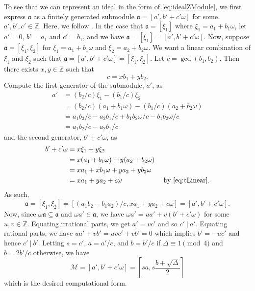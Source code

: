 \documentclass{ucalgthes1}
\theoremstyle{plain}
\theoremstyle{definition}
\newcommand{\MM}{\mathcal{M}}
\newcommand{\ZZ}{\mathbb{Z}}
\begin{document}
To see that we can represent an ideal in the form of \eqref{eq:idealZModule}, we first express $\mathfrak a$ as a finitely generated submodule $\mathfrak a=[a',b'+c'\omega]$ for some $a',b',c' \in \ZZ$.  Here, we follow \cite[pp~85-86]{Jac09}.  In the case that $\mathfrak a = [\xi_1]$ where $\xi_1 = a_1+b_1\omega$, let $a'=0$, $b' = a_1$ and $c'=b_1$, and we have $\mathfrak a = [\xi_1] = [a', b'+c'\omega]$.  Now, suppose $\mathfrak a = [\xi_1, \xi_2]$ for $\xi_1 = a_1 + b_1\omega$ and $\xi_2 = a_2+b_2\omega$.  We want a linear combination of $\xi_1$ and $\xi_2$ such that $\mathfrak a = [a',b'+c'\omega] = [\xi_1, \xi_2]$.  Let $c = \gcd(b_1, b_2)$.  Then there exists $x,y \in \ZZ$ such that 
\begin{equation}
\label{eq:cLinear}
	c = xb_1 + yb_2.
\end{equation}
Compute the first generator of the submodule, $a'$, as
\begin{align*}
	a' &= (b_2/c) \xi_1 - (b_1/c) \xi_2  \\
	&= (b_2/c) (a_1+b_1\omega) - (b_1/c) (a_2+b_2\omega)  \\
	&= a_1b_2/c -a_2b_1/c + b_1b_2\omega/c -b_1b_2\omega/c \\
	&= a_1b_2/c - a_2b_1/c
\end{align*}
and the second generator, $b'+c'\omega$, as
\begin{align*}
	b'+c'\omega &= x\xi_1 + y\xi_2 \\
	&= x(a_1+b_1\omega) + y(a_2+b_2\omega) \\
	&= xa_1+xb_1\omega + ya_2+yb_2\omega \\
	&= xa_1 + ya_2 + c\omega & \mbox{ by \eqref{eq:cLinear}}.
\end{align*}
As such, 
\[
	\mathfrak a = [\xi_1,\xi_2] = [(a_1b_2-b_1a_2)/c, xa_1+ya_2+c\omega] = [a',b'+c'\omega].
\]
Now, since $\omega\mathfrak a \subseteq \mathfrak a$ and $\omega a' \in \mathfrak a$, we have $\omega a' = ua' + v(b'+c'\omega)$ for some $u,v \in \ZZ$. Equating irrational parts, we get $a' = vc'$ and so $c'~|~a'$.  Equating rational parts, we have $ua'+vb' = uvc'+vb' = 0$ which implies $b' = -uc'$ and hence $c'~|~b'$.  Letting $s=c'$, $a=a'/c$, and $b = b'/c$ if $\Delta \equiv 1 \pmod 4$ and $b = 2b'/c$ otherwise, we have
\[
	\MM = [a', b'+c'\omega] = \left[sa, s\frac{b+ \sqrt{\Delta}}{2} \right]
\]
which is the desired computational form.
\end{document}
